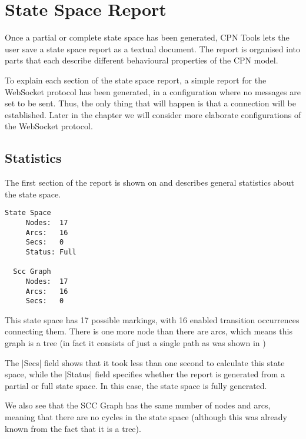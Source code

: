 \section{State Space Report}
Once a partial or complete state space has been generated, CPN Tools lets the
user save a state space report as a textual document. The report is organised
into parts that each describe different behavioural properties of the CPN model.

To explain each section of the state space report, a simple report for the
WebSocket protocol has been generated, in a configuration where no messages are
set to be sent. Thus, the only thing that will happen is that a connection will
be established. Later in the chapter we will consider more elaborate
configurations of the WebSocket protocol.
	
	\subsection{Statistics}
	The first section of the report is shown on  and
	describes general statistics about the state space.
	\begin{lstlisting}[language={},float=h,label=lst:ssa_statistics,
	caption=State Space Report: Statistics]
  State Space
     Nodes:  17
     Arcs:   16
     Secs:   0
     Status: Full

  Scc Graph
     Nodes:  17
     Arcs:   16
     Secs:   0

	\end{lstlisting}
	This state space has 17 possible markings, with 16 enabled transition
	occurrences connecting them. There is one more node than there are arcs, which
	means this graph is a tree (in fact it consists of just a single path as was
	shown in )
	
	The |Secs| field shows that it took less than one second to calculate this
	state space, while the |Status| field specifies whether the report is generated
	from a partial or full state space. In this case, the state space is fully
	generated.
	
	We also see that the SCC Graph has the same number of nodes and arcs, meaning
	that there are no cycles in the state space (although this was already known
	from the fact that it is a tree).
	
